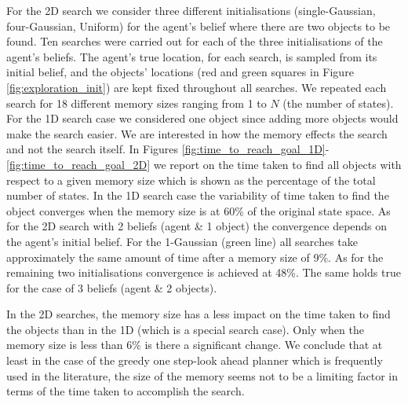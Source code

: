 For the 2D search we consider three different initialisations (single-Gaussian, four-Gaussian, Uniform) for the agent's belief where there are 
two objects to be found. Ten searches were carried out for each of the three initialisations of the agent's beliefs. 
The agent's true location, for each search, is sampled from its initial belief, and the objects' locations 
(red and green squares in Figure \ref{fig:exploration_init}) are kept fixed throughout all searches. We repeated each search for 
18 different memory sizes ranging from 1 to $N$ (the number of states). For the 1D search case we considered one object since adding more objects would 
make the search easier. We are interested in how the memory effects the search and not the search itself. In Figures \ref{fig:time_to_reach_goal_1D}-\ref{fig:time_to_reach_goal_2D} we 
report on the time taken to find all objects with respect to a given memory size which is shown as the percentage of the total number of states. 
In the 1D search case the variability of time taken to find the object converges when the memory size is at 60\% of the original state space. 
As for the 2D search with 2 beliefs (agent \& 1 object) the convergence depends on the agent's initial belief. For the 1-Gaussian (green line) 
all searches take approximately the same amount of time after a memory size of 9\%. As for the remaining two initialisations convergence is achieved at  48\%. 
The same holds true for the case of 3 beliefs (agent \& 2 objects).

In the 2D searches, the memory size has a less impact on the time taken to find the objects than in the 1D (which is a special search case). 
Only when the memory size is less than 6\% is there a significant change. We conclude that at least in the case of 
the greedy one step-look ahead planner which is frequently used in the literature, the size of the memory seems not to be a limiting factor in terms of the time taken to accomplish the search.

